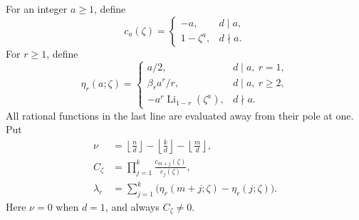 \documentclass[11pt,a4paper,oneside,openany]{book}
\theoremstyle{definition}
\theoremstyle{remark}
\DeclareMathOperator{\Li}{Li}
\begin{document}
For an integer \(a\ge1\), define
\begin{equation}\label{q1:qcc:root-constants}
 c_a(\zeta)=
 \begin{cases}
 -a,&d\mid a,\\
 1-\zeta^a,&d\nmid a.
 \end{cases}
\end{equation}
For \(r\ge1\), define
\begin{equation}\label{q1:qcc:eta}
 \eta_r(a;\zeta)=
 \begin{cases}
 a/2,&d\mid a,\ r=1,\\[1mm]
 \beta_r a^r/r,&d\mid a,\ r\ge2,\\[1mm]
 -a^r\Li_{1-r}(\zeta^a),&d\nmid a.
 \end{cases}
\end{equation}
All rational functions in the last line are evaluated away from their pole at
one. Put
\begin{align}
 \nu&=\left\lfloor\frac nd\right\rfloor
       -\left\lfloor\frac kd\right\rfloor
       -\left\lfloor\frac md\right\rfloor,\label{q1:qcc:root-order}\\
 C_\zeta&=\prod_{j=1}^{k}\frac{c_{m+j}(\zeta)}{c_j(\zeta)},\label{q1:qcc:root-C}\\
 \lambda_r&=\sum_{j=1}^{k}
       \bigl(\eta_r(m+j;\zeta)-\eta_r(j;\zeta)\bigr).
       \label{q1:qcc:root-lambda}
\end{align}
Here \(\nu=0\) when \(d=1\), and always \(C_\zeta\ne0\).
\end{document}
